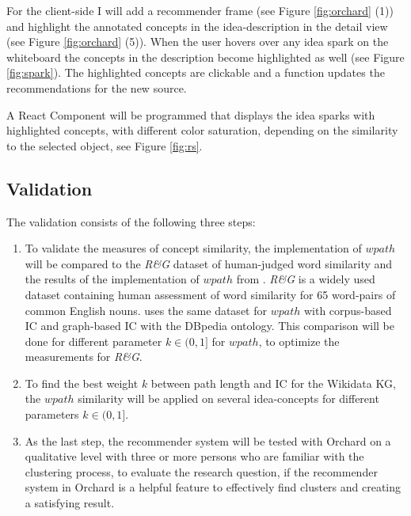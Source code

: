 \documentclass[pdftex,a4paper,12pt]{scrartcl}
\theoremstyle{definition}
\begin{document}
    For the client-side I will add a recommender frame (see Figure \ref{fig:orchard} (1)) and highlight the annotated concepts in the idea-description in the detail view (see Figure \ref{fig:orchard} (5)). When the user hovers over any idea spark on the whiteboard the concepts in the description become highlighted as well (see Figure \ref{fig:spark}). The highlighted concepts are clickable and a function updates the recommendations for the new source. 

    A React Component will be programmed that displays the idea sparks with highlighted concepts, with different color saturation, depending on the similarity to the selected object, see Figure \ref{fig:rs}.
    
    \subsection{Validation}
    The validation consists of the following three steps:  
    \begin{enumerate}
        \item To validate the measures of concept similarity, the implementation of $wpath$ will be compared to the \textit{R\&G} dataset \citep{rubenstein_contextual_1965} of human-judged word similarity and the results of the implementation of $wpath$ from \citet{zhu_computing_2017}. \textit{R\&G} is a widely used dataset containing human assessment of word similarity for 65 word-pairs of common English nouns.
        \citet{zhu_computing_2017} uses the same dataset for $wpath$ with corpus-based IC and graph-based IC with the DBpedia ontology. This comparison will be done for different parameter $k \in (0,1]$ for $wpath$, to optimize the measurements for \textit{R\&G}. 
        \item To find the best weight $k$ between path length and IC for the Wikidata KG, the $wpath$ similarity will be applied on several idea-concepts for different parameters $k \in (0,1]$.
        \item  As the last step, the recommender system will be tested with Orchard on a qualitative level with three or more persons who are familiar with the clustering process, to evaluate the research question, if the recommender system in Orchard is a helpful feature to effectively find clusters and creating a satisfying result. 
    \end{enumerate}
    
    
    
   
    
    
    
\end{document}

